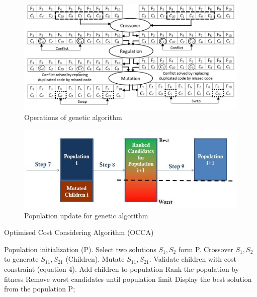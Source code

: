 \documentclass[preprint,12pt]{elsarticle}%
\begin{document}
\begin{figure}[h]
\begin{center}
\includegraphics[scale=0.5]{Images/Drawing2.jpg}
\caption{Operations of genetic algorithm}
\end{center}
\label{Fig3}
\end{figure}

\begin{figure}[!thpb]
\begin{center}
\includegraphics[scale=0.55]{Images/Drawing_1.jpg}
\caption{Population update for genetic algorithm}
\end{center}
\label{Fig2}
\end{figure}

\begin{algorithm}[!thpb]
\caption{Optimised Cost Considering Algorithm (OCCA)}
\begin{algorithmic}[1]
\State Population initialization (P).
\REPEAT  
\State Select two solutions $S_{1},S_{2}$ form P.
\State Crossover $S_{1},S_{2}$ to generate $S_{11},S_{21}$ (Children).
\State Mutate $S_{11},S_{21}$.
\State Validate children with cost constraint (equation 4). 
\State Add children to population
\State Rank the population by fitness
\State Remove worst candidates until population limit
\EndWhile
\State Display the best solution from the population P;
\end{algorithmic}
\end{algorithm}
\end{document}
